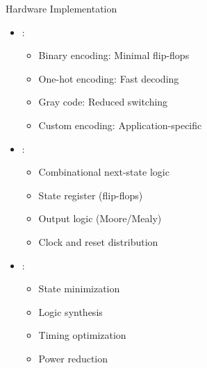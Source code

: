 \begin{frame}{Hardware Implementation}
\begin{itemize}
\item {}:
\begin{itemize}
\item Binary encoding: Minimal flip-flops
\item One-hot encoding: Fast decoding
\item Gray code: Reduced switching
\item Custom encoding: Application-specific
\end{itemize}
\vspace{0.5cm}
\item {}:
\begin{itemize}
\item Combinational next-state logic
\item State register (flip-flops)
\item Output logic (Moore/Mealy)
\item Clock and reset distribution
\end{itemize}
\vspace{0.3cm}
\item {}:
\begin{itemize}
\item State minimization
\item Logic synthesis
\item Timing optimization
\item Power reduction
\end{itemize}
\end{itemize}
\end{frame}

